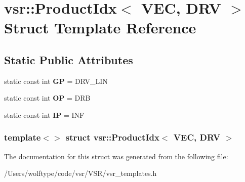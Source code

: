 \hypertarget{structvsr_1_1_product_idx_3_01_v_e_c_00_01_d_r_v_01_4}{\section{vsr\-:\-:Product\-Idx$<$ V\-E\-C, D\-R\-V $>$ Struct Template Reference}
\label{structvsr_1_1_product_idx_3_01_v_e_c_00_01_d_r_v_01_4}
}
\subsection*{Static Public Attributes}
\begin{DoxyCompactItemize}
\item 
\hypertarget{structvsr_1_1_product_idx_3_01_v_e_c_00_01_d_r_v_01_4_a21e3f898b3221531191548bed271a9f0}{static const int {\bfseries G\-P} = D\-R\-V\-\_\-\-L\-I\-N}\label{structvsr_1_1_product_idx_3_01_v_e_c_00_01_d_r_v_01_4_a21e3f898b3221531191548bed271a9f0}

\item 
\hypertarget{structvsr_1_1_product_idx_3_01_v_e_c_00_01_d_r_v_01_4_aa80ba12193dd7d4c5fb2c7bdddd03aa9}{static const int {\bfseries O\-P} = D\-R\-B}\label{structvsr_1_1_product_idx_3_01_v_e_c_00_01_d_r_v_01_4_aa80ba12193dd7d4c5fb2c7bdddd03aa9}

\item 
\hypertarget{structvsr_1_1_product_idx_3_01_v_e_c_00_01_d_r_v_01_4_adc4e7cade0633d68adb21be14bf09240}{static const int {\bfseries I\-P} = I\-N\-F}\label{structvsr_1_1_product_idx_3_01_v_e_c_00_01_d_r_v_01_4_adc4e7cade0633d68adb21be14bf09240}

\end{DoxyCompactItemize}
\subsubsection*{template$<$$>$ struct vsr\-::\-Product\-Idx$<$ V\-E\-C, D\-R\-V $>$}



The documentation for this struct was generated from the following file\-:\begin{DoxyCompactItemize}
\item 
/\-Users/wolftype/code/vsr/\-V\-S\-R/vsr\-\_\-templates.\-h\end{DoxyCompactItemize}
